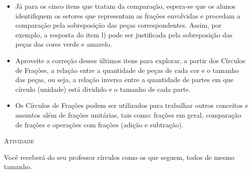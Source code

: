 \documentclass[10 pt,usenames,dvipsnames, oneside]{article}
\begin{document}
\begin{goals}
\begin{itemize}
    \item Já para os cinco itens que tratam da comparação, espera-se que os alunos identifiquem os setores que representam as frações envolvidas e procedam a comparação pela sobreposição das peças correspondentes. Assim, por exemplo, a resposta do item l) pode ser justificada pela sobreposição das peças das cores verde e amarelo.
    \item Aproveite a correção desses últimos itens para explorar, a partir dos Círculos de Frações, a relação entre a quantidade de peças de cada cor e o tamanho das peças, ou seja, a relação inversa entre a quantidade de partes em que círculo (unidade) está dividido e o tamanho de cada parte.
    \item Os Círculos de Frações podem ser utilizados para trabalhar outros conceitos e assuntos além de frações unitárias, tais como: frações em geral, comparação de frações e operações com frações (adição e subtração). 
    \end{itemize}


\end{goals}

\bigskip
\begin{center}
{\large \scshape Atividade}
\end{center}
\fi

Você receberá do seu professor círculos como os que seguem, todos de mesmo tamanho. 
\end{document}
